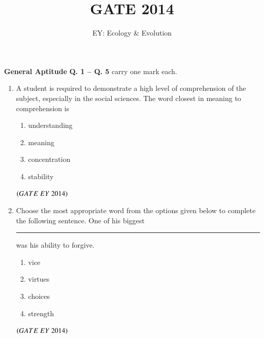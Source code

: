 \documentclass[journal]{IEEEtran}
\numberwithin{equation}{enumi}
\numberwithin{figure}{enumi}
\begin{document}

\vspace{3cm}

\title{GATE 2014}
\author{EY: Ecology \& Evolution}
\maketitle

\noindent \textbf{General Aptitude}
\newline
\newline
\noindent \textbf{Q. 1 -- Q. 5} carry one mark each.

\begin{enumerate}
    \item A student is required to demonstrate a high level of comprehension of the subject, especially in the social sciences. \newline The word closest in meaning to comprehension is

    \begin{multicols}{4}
    \begin{enumerate}
        \item understanding
        \item meaning
        \item concentration
        \item stability
    \end{enumerate}
    \end{multicols}
    \hfill{$\brak{ GATE\ EY\ 2014}$}
    \bigskip
    
    \item Choose the most appropriate word from the options given below to complete the following sentence. \newline One of his biggest \rule{3cm}{0.15mm} was his ability to forgive.
    \begin{multicols}{4}
    \begin{enumerate}
        \item vice
        \item virtues
        \item choices
        \item strength
    \end{enumerate}
    \end{multicols}
    \hfill{$\brak{ GATE\ EY\ 2014}$}
    \bigskip


\end{enumerate}
\end{document}
